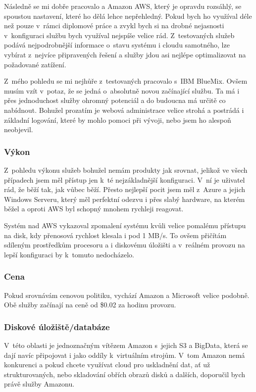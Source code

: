 Následně se mi dobře pracovalo a Amazon AWS, který je opravdu rozsáhlý, se spoustou nastavení, které ho dělá lehce nepřehledný. Pokud bych ho využíval déle než pouze v~rámci diplomové práce a zvykl bych si na drobné nejasnosti v~konfiguraci službu bych využíval nejspíše velice rád. Z~testovaných služeb podává nejpodrobnější informace o~stavu systému i cloudu samotného, lze vybírat z~nejvíce připravených řešení a služby jdou asi nejlépe optimalizovat na požadované zatížení.

Z~mého pohledu se mi nejhůře z~testovaných pracovalo s~IBM BlueMix. Ovšem musím vzít v~potaz, že se jedná o~absolutně novou začínající službu. Ta má i přes jednoduchost služby ohromný potenciál a do budoucna má určitě co nabídnout. Bohužel prozatím je webová administrace velice strohá a postrádá i základní logování, které by mohlo pomoci při vývoji, nebo jsem ho alespoň neobjevil.

\subsubsection{Výkon}
Z~pohledu výkonu služeb bohužel nemám produkty jak srovnat, jelikož ve všech případech jsem měl přístup jen k~té nejzákladnější konfiguraci. V~ní je uživatel rád, že běží tak, jak vůbec běží. Přesto nejlepší pocit jsem měl z~Azure a jejich Windows Serveru, který měl perfektní odezvu i přes slabý hardware, na kterém běžel a oproti AWS byl schopný mnohem rychleji reagovat.

Systém nad AWS vykazoval zpomalení systému kvůli velice pomalému přístupu na disk, kdy přenosová rychlost klesala i pod 1 MB/s. To ovšem přičítám sdíleným prostředkům procesoru a i diskovému úložišti a v~reálném provozu na lepší konfiguraci by k~tomuto nedocházelo.

\subsubsection{Cena}
Pokud srovnávám cenovou politiku, vychází Amazon a Microsoft velice podobně. Obě služby začínají na ceně od \$0.02 za hodinu provozu.

\subsubsection{Diskové úložiště/databáze}
V~této oblasti je jednoznačným vítězem Amazon s~jejich S3 a BigData, která se dají navíc připojovat i jako oddíly k~virtuálním strojům. V~tom Amazon nemá konkurenci a pokud chcete využívat cloud pro uskladnění dat, ať už strukturovaných, nebo skladování obřích obrazů disků a dalších, doporučil bych právě služby Amazonu.

